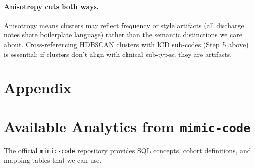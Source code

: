 \documentclass[11pt,a4paper]{article}
\begin{document}
\paragraph{Anisotropy cuts both ways.}
Anisotropy means clusters may reflect frequency or style artifacts (all discharge notes share boilerplate language) rather than the semantic distinctions we care about.  Cross-referencing HDBSCAN clusters with ICD sub-codes (Step~5 above) is essential: if clusters don't align with clinical sub-types, they are artifacts.




\appendix
\section*{Appendix}

\section{Available Analytics from \texttt{mimic-code}}
\label{sec:mimic-code}

The official \texttt{mimic-code} repository provides SQL concepts, cohort definitions, and mapping tables that we can use.
\end{document}
